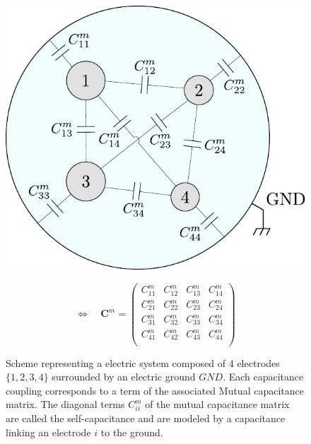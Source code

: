 \begin{figure}
\begin{minipage}{0.48\textwidth}
	\centering
    \includegraphics[width=\textwidth]{Figures/Electrodes/mutual_capacitance_scheme.pdf}
\end{minipage}
\begin{minipage}{0.48\textwidth}
	\begin{equation*}
	\Leftrightarrow \quad
	\bm{C}^m = 
	\begin{pmatrix}
	C_{11}^m & C_{12}^m & C_{13}^m & C_{14}^m \\ 
	C_{21}^m & C_{22}^m & C_{23}^m & C_{24}^m\\
	C_{31}^m & C_{32}^m & C_{33}^m & C_{34}^m \\
	C_{41}^m & C_{42}^m & C_{43}^m & C_{44}^m \\
	\end{pmatrix}
	\end{equation*}
\end{minipage}
\caption{Scheme representing a electric system composed of 4 electrodes $\{1,2,3,4\}$ surrounded by an electric ground $GND$. Each capacitance coupling corresponds to a term of the associated Mutual capacitance matrix. The diagonal terms $C_{ii}^m$ of the mutual capacitance matrix are called the self-capacitance and are modeled by a capacitance linking an electrode $i$ to the ground.}
\label{fig:lumped-capacitance}
\end{figure}

